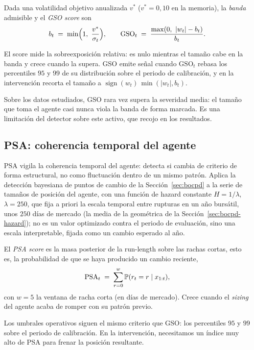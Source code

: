 \begin{definicion}
\label{def:gso}
Dada una volatilidad objetivo anualizada $v^{\ast}$ ($v^{\ast}=0{,}10$ en la memoria), la \emph{banda} admisible y el \emph{GSO score} son
\[
b_t \;=\; \min\!\Big(1,\ \frac{v^{\ast}}{\sigmat}\Big),
\qquad
\mathrm{GSO}_t \;=\; \frac{\max(0,\ |w_t| - b_t)}{b_t}.
\]
\end{definicion}

El score mide la sobreexposición relativa: es nulo mientras el tamaño cabe en la banda y crece cuando la supera. GSO emite señal cuando $\mathrm{GSO}_t$ rebasa los percentiles $95$ y $99$ de su distribución sobre el periodo de calibración, y en la intervención recorta el tamaño a $\operatorname{sign}(w_t)\,\min(|w_t|, b_t)$.

Sobre los datos estudiados, GSO rara vez supera la severidad media: el tamaño que toma el agente casi nunca viola la banda de forma marcada. Es una limitación del detector sobre este activo, que recojo en los resultados.

\subsection{PSA: coherencia temporal del agente}
\label{sec:strata-psa}

PSA vigila la coherencia temporal del agente: detecta si cambia de criterio de forma estructural, no como fluctuación dentro de un mismo patrón. Aplica la detección bayesiana de puntos de cambio de la Sección~\ref{sec:bocpd} a la serie de tamaños de posición del agente, con una función de hazard constante $H = 1/\lambda$, $\lambda = 250$, que fija a priori la escala temporal entre rupturas en un año bursátil, unos $250$ días de mercado (la media de la geométrica de la Sección~\ref{sec:bocpd-hazard}); no es un valor optimizado contra el periodo de evaluación, sino una escala interpretable, fijada como un cambio esperado al año.

\begin{definicion}
\label{def:psa}
El \emph{PSA score} es la masa posterior de la run-length sobre las rachas cortas, esto es, la probabilidad de que se haya producido un cambio reciente,
\[
\mathrm{PSA}_t \;=\; \sum_{r=0}^{w} \mathbb{P}(r_t = r \mid x_{1:t}),
\]
con $w=5$ la ventana de racha corta (en días de mercado). Crece cuando el \emph{sizing} del agente acaba de romper con su patrón previo.
\end{definicion}

Los umbrales operativos siguen el mismo criterio que GSO: los percentiles $95$ y $99$ sobre el periodo de calibración. En la intervención, necesitamos un índice muy alto de PSA para frenar la posición resultante.

